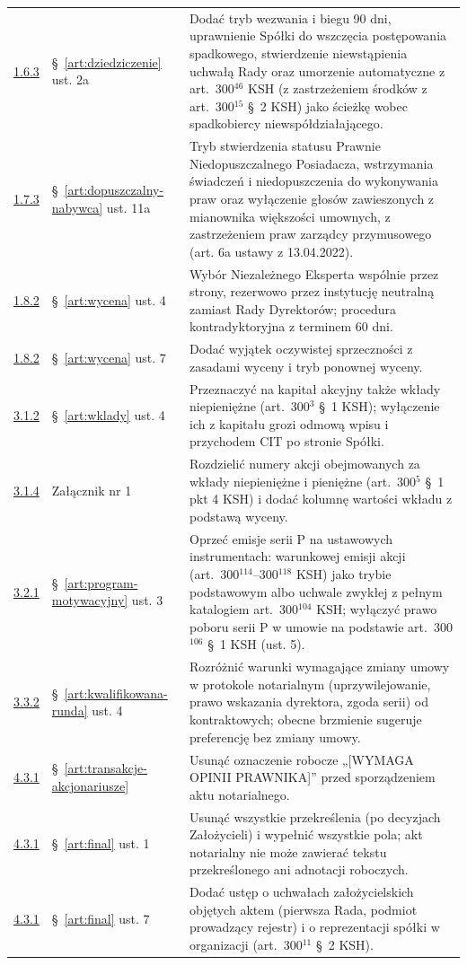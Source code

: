 \documentclass[12pt,a4paper]{report}
\begin{document}
\begin{longtable}{@{}p{1.3cm} p{3.3cm} p{9.6cm}@{}}
\hyperref[memo:1.6.3]{1.6.3} & §~\ref{art:dziedziczenie} ust. 2a & Dodać tryb wezwania i biegu 90 dni, uprawnienie Spółki do wszczęcia postępowania spadkowego, stwierdzenie niewstąpienia uchwałą Rady oraz umorzenie automatyczne z art.~300$^{46}$ KSH (z zastrzeżeniem środków z art.~300$^{15}$ §~2 KSH) jako ścieżkę wobec spadkobiercy niewspółdziałającego. \\
\hyperref[memo:1.7.3]{1.7.3} & §~\ref{art:dopuszczalny-nabywca} ust. 11a & Tryb stwierdzenia statusu Prawnie Niedopuszczalnego Posiadacza, wstrzymania świadczeń i niedopuszczenia do wykonywania praw oraz wyłączenie głosów zawieszonych z mianownika większości umownych, z zastrzeżeniem praw zarządcy przymusowego (art. 6a ustawy z 13.04.2022). \\
\hyperref[memo:1.8.2]{1.8.2} & §~\ref{art:wycena} ust. 4 & Wybór Niezależnego Eksperta wspólnie przez strony, rezerwowo przez instytucję neutralną zamiast Rady Dyrektorów; procedura kontradyktoryjna z terminem 60 dni. \\
\hyperref[memo:1.8.2]{1.8.2} & §~\ref{art:wycena} ust. 7 & Dodać wyjątek oczywistej sprzeczności z zasadami wyceny i tryb ponownej wyceny. \\
\hyperref[memo:3.1.2]{3.1.2} & §~\ref{art:wklady} ust. 4 & Przeznaczyć na kapitał akcyjny także wkłady niepieniężne (art.~300$^{3}$ §~1 KSH); wyłączenie ich z kapitału grozi odmową wpisu i przychodem CIT po stronie Spółki. \\
\hyperref[memo:3.1.4]{3.1.4} & Załącznik nr 1 & Rozdzielić numery akcji obejmowanych za wkłady niepieniężne i pieniężne (art.~300$^{5}$ §~1 pkt 4 KSH) i dodać kolumnę wartości wkładu z podstawą wyceny. \\
\hyperref[memo:3.2.1]{3.2.1} & §~\ref{art:program-motywacyjny} ust. 3 & Oprzeć emisje serii P na ustawowych instrumentach: warunkowej emisji akcji (art.~300$^{114}$–300$^{118}$ KSH) jako trybie podstawowym albo uchwale zwykłej z pełnym katalogiem art.~300$^{104}$ KSH; wyłączyć prawo poboru serii P w umowie na podstawie art.~300$^{106}$ §~1 KSH (ust. 5). \\
\hyperref[memo:3.3.2]{3.3.2} & §~\ref{art:kwalifikowana-runda} ust. 4 & Rozróżnić warunki wymagające zmiany umowy w protokole notarialnym (uprzywilejowanie, prawo wskazania dyrektora, zgoda serii) od kontraktowych; obecne brzmienie sugeruje preferencję bez zmiany umowy. \\
\hyperref[memo:4.3.1]{4.3.1} & §~\ref{art:transakcje-akcjonariusze} & Usunąć oznaczenie robocze „[WYMAGA OPINII PRAWNIKA]” przed sporządzeniem aktu notarialnego. \\
\hyperref[memo:4.3.1]{4.3.1} & §~\ref{art:final} ust. 1 & Usunąć wszystkie przekreślenia (po decyzjach Założycieli) i wypełnić wszystkie pola; akt notarialny nie może zawierać tekstu przekreślonego ani adnotacji roboczych. \\
\hyperref[memo:4.3.1]{4.3.1} & §~\ref{art:final} ust. 7 & Dodać ustęp o uchwałach założycielskich objętych aktem (pierwsza Rada, podmiot prowadzący rejestr) i o reprezentacji spółki w organizacji (art.~300$^{11}$ §~2 KSH). \\
\bottomrule
\end{longtable}
\end{document}
